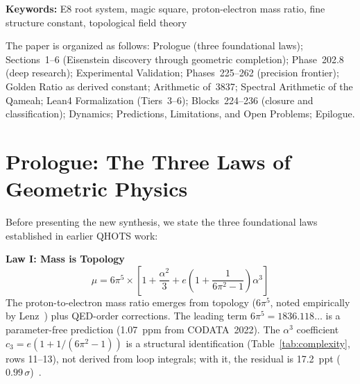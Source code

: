 \documentclass[aps,prd,twocolumn,superscriptaddress,floatfix,nofootinbib]{revtex4-2}
\theoremstyle{definition}
\theoremstyle{remark}
\begin{document}
\begin{abstract}
We prove that the symmetric part $S = (Q+Q^T)/2$ of the deviated Qameah acts as a Hamiltonian for Schr\"{o}dinger dynamics on the 11-dimensional lattice; the anti-commutation relation $\{S,A\}=0$ (with $A=(Q-Q^T)/2$) is machine-verified. All five eigenfrequency pairs are recovered under Schr\"{o}dinger evolution---confirming the \textbf{Naming Correction} (Phase 203.4): Q stands for \textit{Qameah} (11$\times$11 magic square), not ``Quantum'', and the eigenvalues $\lambda_k = \pm i\omega_k$ establish the Qameah as a system of coupled harmonic oscillators. The complete framework---883 declarations (842 theorems, 41 definitions) across 60 files---is machine-verified in Lean~4 with Mathlib, 0~\texttt{sorry}.
\end{abstract}

\noindent\textbf{Keywords:} E8 root system, magic square, proton-electron mass ratio, fine structure constant, topological field theory

\maketitle

\tableofcontents

The paper is organized as follows: Prologue (three foundational laws); Sections~1--6 (Eisenstein discovery through geometric completion); Phase~202.8 (deep research); Experimental Validation; Phases~225--262 (precision frontier); Golden Ratio as derived constant; Arithmetic of~3837; Spectral Arithmetic of the Qameah; Lean4 Formalization (Tiers~3--6); Blocks~224--236 (closure and classification); Dynamics; Predictions, Limitations, and Open Problems; Epilogue.

\section{Prologue: The Three Laws of Geometric Physics}
\label{sec:prologue}

Before presenting the new synthesis, we state the three foundational laws established in earlier QHOTS work:

\textbf{Law I: Mass is Topology}
\begin{equation}
\mu = 6\pi^5 \times \left[1 + \frac{\alpha^2}{3} + e\left(1+\frac{1}{6\pi^2-1}\right)\alpha^3\right]
\end{equation}
The proton-to-electron mass ratio emerges from topology ($6\pi^5$, noted empirically by Lenz~\cite{lenz1951}) plus QED-order corrections. The leading term $6\pi^5 = 1836.118\ldots$ is a parameter-free prediction (1.07~ppm from CODATA~2022). The $\alpha^3$ coefficient $c_3 = e(1+1/(6\pi^2-1))$ is a structural identification (Table~\ref{tab:complexity}, rows 11--13), not derived from loop integrals; with it, the residual is 17.2~ppt ($0.99\,\sigma$)~\cite{codata}.
\end{document}
